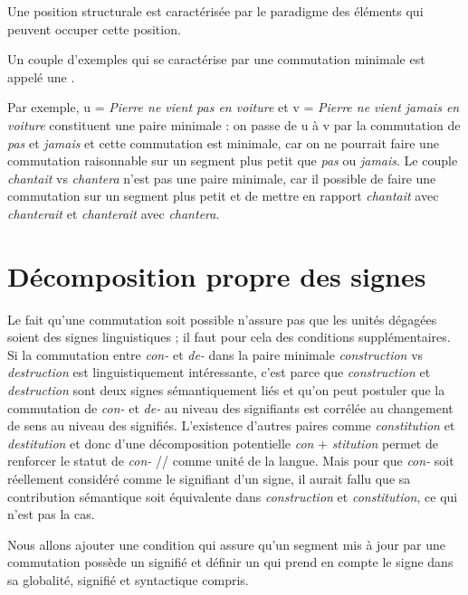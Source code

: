 Une position structurale est caractérisée par le paradigme des éléments qui peuvent occuper cette position.

{Un couple d’exemples qui se caractérise par une commutation minimale est appelé une .}

Par exemple, u = \textit{Pierre ne vient pas en voiture} et v = \textit{Pierre ne vient jamais en voiture} constituent une paire minimale : on passe de u à v par la commutation de \textit{pas} et \textit{jamais} et cette commutation est minimale, car on ne pourrait faire une commutation raisonnable sur un segment plus petit que \textit{pas} ou \textit{jamais}. Le couple \textit{chantait} vs \textit{chantera} n’est pas une paire minimale, car il possible de faire une commutation sur un segment plus petit et de mettre en rapport \textit{chantait} avec \textit{chanterait} et \textit{chanterait} avec \textit{chantera}.

\section{Décomposition propre des signes}\label{sec:2.2.2}

Le fait qu’une commutation soit possible n’assure pas que les unités dégagées soient des signes linguistiques ; il faut pour cela des conditions supplémentaires. Si la commutation entre \textit{con-} et \textit{de-} dans la paire minimale \textit{construction} vs \textit{destruction} est linguistiquement intéressante, c’est parce que \textit{construction} et \textit{destruction} sont deux signes sémantiquement liés et qu’on peut postuler que la commutation de \textit{con-} et \textit{de-} au niveau des signifiants est corrélée au changement de sens au niveau des signifiés. L’existence d’autres paires comme \textit{constitution} et \textit{destitution} et donc d’une décomposition potentielle \textit{con} + \textit{stitution} permet de renforcer le statut de \textit{con-} // comme unité de la langue. Mais pour que \textit{con-} soit réellement considéré comme le signifiant d’un signe, il aurait fallu que sa contribution sémantique soit équivalente dans \textit{construction} et \textit{constitution}, ce qui n’est pas la cas.

Nous allons ajouter une condition qui assure qu’un segment mis à jour par une commutation possède un signifié et définir un  qui prend en compte le signe dans sa globalité, signifié et syntactique compris.

